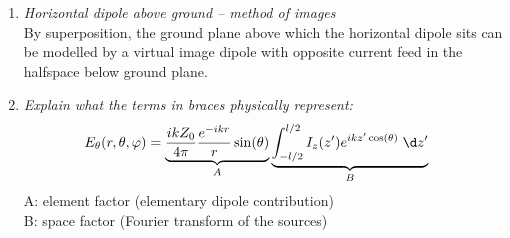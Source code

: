 \documentclass[11pt,a4paper]{article}
\begin{document}
\begin{enumerate}
    \item \emph{Horizontal dipole above ground -- method of images}\\
    By superposition, the ground plane above which the horizontal dipole sits can be modelled by a virtual image dipole with opposite current feed in the halfspace below ground plane.

    \item \emph{Explain what the terms in braces physically represent:}
    \begin{align*}
        E_\theta(r,\theta,\varphi) &= \underbrace{\frac{ikZ_0}{4\pi} \frac{e^{-ikr}}{r} \sin(\theta)}_A \underbrace{\int_{-l/2}^{l/2} I_z(z') e^{ikz' \cos(\theta)} \; \d z'}_B
    \end{align*}
    A: element factor (elementary dipole contribution)\\
    B: space factor (Fourier transform of the sources)
\end{enumerate}
\end{document}
